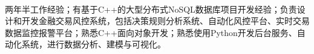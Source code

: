 \documentclass[11pt, a4paper, UTF8]{awesome-cv}
\begin{document}
\makecvheader[R]

\makecvfooter
  {\ }
  {\ }
  {\ }




\begin{cvparagraph}
两年半工作经验；有基于C++的大型分布式NoSQL数据库项目开发经验；负责设计和开发金融交易风控系统，包括决策规则分析系统、自动化风控平台、实时交易数据监控报警平台；熟悉C++面向对象开发；熟悉使用Python开发后台服务、自动化系统，进行数据分析、建模与可视化。
\end{cvparagraph}
\end{document}
